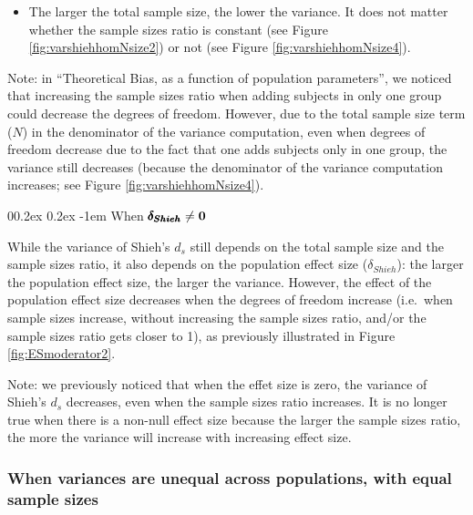 \documentclass[
  english,
  man,mask]{apa6}
\makeatletter
\providecommand{\tightlist}{%
  \setlength{\itemsep}{0pt}\setlength{\parskip}{0pt}}
\let\oldparagraph\paragraph
\renewcommand{\paragraph}[1]{\oldparagraph{#1}\mbox{}}
\renewcommand{\paragraph}{\@startsection{paragraph}{4}{\parindent}%
  {0\baselineskip \@plus 0.2ex \@minus 0.2ex}%
  {-1em}%
  {\normalfont\normalsize\bfseries\itshape\typesectitle}}
\makeatother
\begin{document}
\begin{itemize}
\tightlist
\item
  The larger the total sample size, the lower the variance. It does not matter whether the sample sizes ratio is constant (see Figure \ref{fig:varshiehhomNsize2}) or not (see Figure \ref{fig:varshiehhomNsize4}).
\end{itemize}

Note: in \enquote{Theoretical Bias, as a function of population parameters}, we noticed that increasing the sample sizes ratio when adding subjects in only one group could decrease the degrees of freedom. However, due to the total sample size term (\(N\)) in the denominator of the variance computation, even when degrees of freedom decrease due to the fact that one adds subjects only in one group, the variance still decreases (because the denominator of the variance computation increases; see Figure \ref{fig:varshiehhomNsize4}).

\hypertarget{when-bf-pmbdelta_shieh-neq-0}{%
\paragraph{\texorpdfstring{When \(\bf \pmb{\delta_{Shieh}} \neq 0\)}{When \textbackslash bf \textbackslash pmb\{\textbackslash delta\_\{Shieh\}\} \textbackslash neq 0}}\label{when-bf-pmbdelta_shieh-neq-0}}

While the variance of Shieh's \(d_s\) still depends on the total sample size and the sample sizes ratio, it also depends on the population effect size (\(\delta_{Shieh}\)): the larger the population effect size, the larger the variance. However, the effect of the population effect size decreases when the degrees of freedom increase (i.e.~when sample sizes increase, without increasing the sample sizes ratio, and/or the sample sizes ratio gets closer to 1), as previously illustrated in Figure \ref{fig:ESmoderator2}.

Note: we previously noticed that when the effet size is zero, the variance of Shieh's \(d_s\) decreases, even when the sample sizes ratio increases. It is no longer true when there is a non-null effect size because the larger the sample sizes ratio, the more the variance will increase with increasing effect size.

\hypertarget{when-variances-are-unequal-across-populations-with-equal-sample-sizes-2}{%
\subsubsection{When variances are unequal across populations, with equal sample sizes}\label{when-variances-are-unequal-across-populations-with-equal-sample-sizes-2}}
\end{document}

